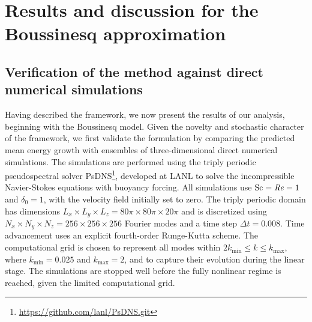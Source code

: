 \section{Results and discussion for the Boussinesq approximation}
\label{sec:boussinesq}

\subsection{Verification of the method against direct numerical simulations}
\label{subsec:dns_verification}
Having described the framework, we now present the results of our analysis, beginning with the
Boussinesq model. Given the novelty and stochastic character of
the framework, we first validate the formulation by comparing the predicted mean energy growth
with ensembles of three-dimensional direct numerical simulations.
The simulations are performed using the triply periodic pseudospectral solver
PsDNS\footnote{\url{https://github.com/lanl/PsDNS.git}}, developed at LANL to solve the
incompressible Navier-Stokes equations with buoyancy forcing. All simulations use
\(\mathrm{Sc}=\mathit{Re}=1\) and \(\delta_0=1\), with the velocity field initially set to
zero. The triply periodic domain has dimensions
\(L_x\times L_y\times L_z=80\pi\times80\pi\times20\pi\) and is discretized using
\(N_x\times N_y\times N_z=256\times256\times256\) Fourier modes and a time step
\(\Delta t=0.008\). Time advancement uses an explicit fourth-order Runge-Kutta scheme. The
computational grid is chosen to represent all modes within \(2k_{\min}\leq k\leq k_{\max}\),
where \(k_{\min}=0.025\) and \(k_{\max}=2\), and to capture their evolution during the linear
stage. The simulations are stopped well before the fully nonlinear regime is reached, given the limited
computational grid.

